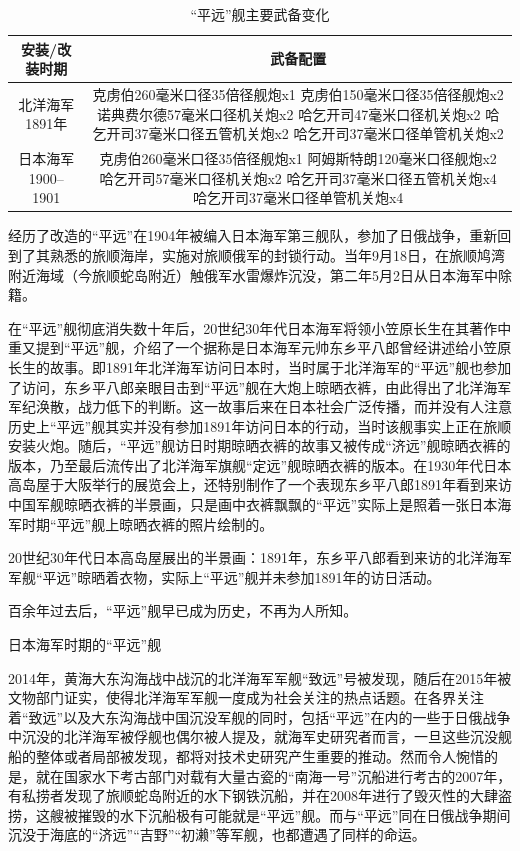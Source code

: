 \documentclass[12pt,UTF8]{ctexbook}
\begin{document}
\begin{table}[]
	\centering
	\label{tab:标签}
	\caption{“平远”舰主要武备变化}
	\begin{tabular}{|c|c|}
		\hline
		安装/改装时期 & 武备配置 \\
		\hline
		北洋海军1891年 & 克虏伯260毫米口径35倍径舰炮x1 克虏伯150毫米口径35倍径舰炮x2 诺典费尔德57毫米口径机关炮x2 哈乞开司47毫米口径机关炮x2 哈乞开司37毫米口径五管机关炮x2 哈乞开司37毫米口径单管机关炮x2 \\
		\hline
		日本海军1900--1901 & 克虏伯260毫米口径35倍径舰炮x1 阿姆斯特朗120毫米口径舰炮x2 哈乞开司57毫米口径机关炮x2 哈乞开司37毫米口径五管机关炮x4 哈乞开司37毫米口径单管机关炮x4 \\
		\hline
	\end{tabular}
\end{table}

经历了改造的“平远”在1904年被编入日本海军第三舰队，参加了日俄战争，重新回到了其熟悉的旅顺海岸，实施对旅顺俄军的封锁行动。当年9月18日，在旅顺鸠湾附近海域（今旅顺蛇岛附近）触俄军水雷爆炸沉没，第二年5月2日从日本海军中除籍。

在“平远”舰彻底消失数十年后，20世纪30年代日本海军将领小笠原长生在其著作中重又提到“平远”舰，介绍了一个据称是日本海军元帅东乡平八郎曾经讲述给小笠原长生的故事。即1891年北洋海军访问日本时，当时属于北洋海军的“平远”舰也参加了访问，东乡平八郎亲眼目击到“平远”舰在大炮上晾晒衣裤，由此得出了北洋海军军纪涣散，战力低下的判断。这一故事后来在日本社会广泛传播，而并没有人注意历史上“平远”舰其实并没有参加1891年访问日本的行动，当时该舰事实上正在旅顺安装火炮。随后，“平远”舰访日时期晾晒衣裤的故事又被传成“济远”舰晾晒衣裤的版本，乃至最后流传出了北洋海军旗舰“定远”舰晾晒衣裤的版本。在1930年代日本高岛屋于大阪举行的展览会上，还特别制作了一个表现东乡平八郎1891年看到来访中国军舰晾晒衣裤的半景画，只是画中衣裤飘飘的“平远”实际上是照着一张日本海军时期“平远”舰上晾晒衣裤的照片绘制的。

20世纪30年代日本高岛屋展出的半景画：1891年，东乡平八郎看到来访的北洋海军军舰“平远”晾晒着衣物，实际上“平远”舰并未参加1891年的访日活动。

百余年过去后，“平远”舰早已成为历史，不再为人所知。

日本海军时期的“平远”舰

2014年，黄海大东沟海战中战沉的北洋海军军舰“致远”号被发现，随后在2015年被文物部门证实，使得北洋海军军舰一度成为社会关注的热点话题。在各界关注着“致远”以及大东沟海战中国沉没军舰的同时，包括“平远”在内的一些于日俄战争中沉没的北洋海军被俘舰也偶尔被人提及，就海军史研究者而言，一旦这些沉没舰船的整体或者局部被发现，都将对技术史研究产生重要的推动。然而令人惋惜的是，就在国家水下考古部门对载有大量古瓷的“南海一号”沉船进行考古的2007年，有私捞者发现了旅顺蛇岛附近的水下钢铁沉船，并在2008年进行了毁灭性的大肆盗捞，这艘被摧毁的水下沉船极有可能就是“平远”舰。而与“平远”同在日俄战争期间沉没于海底的“济远”“吉野”“初濑”等军舰，也都遭遇了同样的命运。
\end{document}
